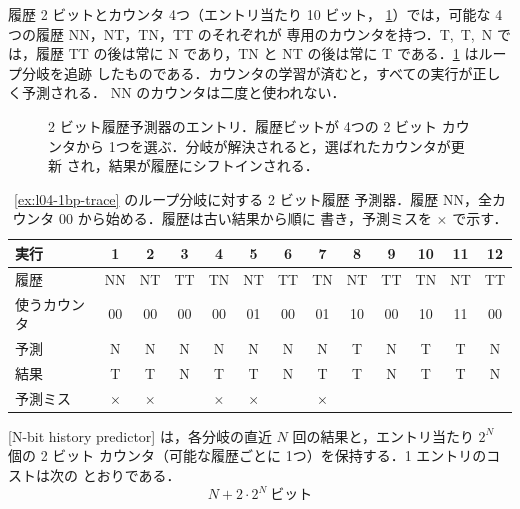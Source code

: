 \documentclass[../main.tex]{subfiles}
\begin{document}
履歴 2 ビットとカウンタ 4つ（エントリ当たり 10 ビット，
\cref{fig:l04-history}）では，可能な 4つの履歴 NN，NT，TN，TT のそれぞれが
専用のカウンタを持つ．T,~T,~N では，履歴 TT の後は常に N であり，TN と
NT の後は常に T である．\cref{tab:l04-history-trace} はループ分岐を追跡
したものである．カウンタの学習が済むと，すべての実行が正しく予測される．
NN のカウンタは二度と使われない．

\begin{figure}[htbp]
  \centering
  
  \caption{2 ビット履歴予測器のエントリ．履歴ビットが 4つの 2 ビット
    カウンタから 1つを選ぶ．分岐が解決されると，選ばれたカウンタが更新
    され，結果が履歴にシフトインされる．}
  \label{fig:l04-history}
\end{figure}

\begin{table}[htbp]
  \centering\small
  \caption{\cref{ex:l04-1bp-trace} のループ分岐に対する 2 ビット履歴
    予測器．履歴 NN，全カウンタ 00 から始める．履歴は古い結果から順に
    書き，予測ミスを $\times$ で示す．}
  \label{tab:l04-history-trace}
  \setlength{\tabcolsep}{3.6pt}
  \begin{tabular}{@{}lcccccccccccc@{}}
    \toprule
    実行           & 1 & 2 & 3 & 4 & 5 & 6 & 7 & 8 & 9 & 10 & 11 & 12 \\
    \midrule
    履歴           & NN & NT & TT & TN & NT & TT & TN & NT & TT & TN & NT & TT \\
    使うカウンタ   & 00 & 00 & 00 & 00 & 01 & 00 & 01 & 10 & 00 & 10 & 11 & 00 \\
    予測           & N & N & N & N & N & N & N & T & N & T & T & N \\
    結果           & T & T & N & T & T & N & T & T & N & T & T & N \\
    予測ミス       & $\times$ & $\times$ & & $\times$ & $\times$ & & $\times$ & & & & & \\
    \bottomrule
  \end{tabular}
\end{table}

\begin{definition}[$N$ ビット履歴予測器]
  [N-bit history predictor]%
  は，各分岐の直近 $N$ 回の結果と，エントリ当たり $2^N$ 個の 2 ビット
  カウンタ（可能な履歴ごとに 1つ）を保持する．1 エントリのコストは次の
  とおりである．
  \begin{equation}
    N + 2 \cdot 2^N \ \text{ビット}
    \label{eq:l04-history-cost}
  \end{equation}
\end{definition}
\end{document}
